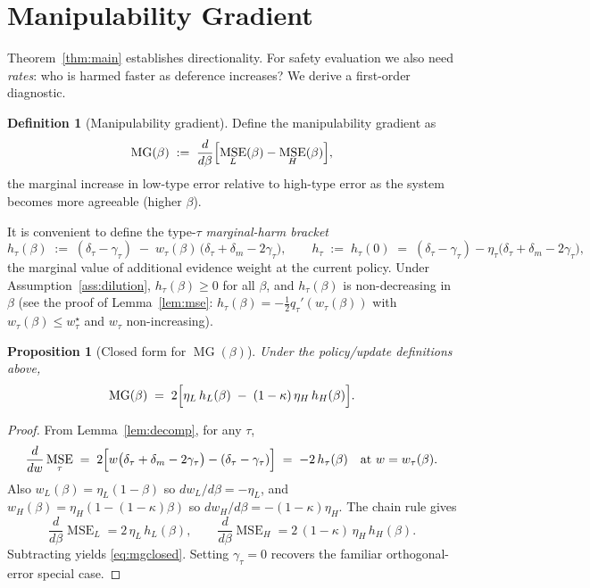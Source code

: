 \documentclass[11pt]{article}
\newtheorem{proposition}[theorem]{Proposition}
\theoremstyle{definition}
\newtheorem{definition}[theorem]{Definition}
\theoremstyle{remark}
\numberwithin{equation}{section}
\DeclareMathOperator{\MSE}{MSE}
\DeclareMathOperator{\MG}{MG}
\begin{document}
\section{Manipulability Gradient}\label{sec:mg}

Theorem~\ref{thm:main} establishes directionality. For safety evaluation we also need \emph{rates}: who is harmed faster as deference increases? We derive a first-order diagnostic.

\begin{definition}[Manipulability gradient]\label{def:mg}
Define the manipulability gradient as
\begin{equation}\label{eq:mg}
\MG(\beta) \;:=\; \frac{d}{d\beta}\Bigl[\MSE_L(\beta) - \MSE_H(\beta)\Bigr],
\end{equation}
the marginal increase in low-type error relative to high-type error as the system becomes more agreeable (higher $\beta$).
\end{definition}

It is convenient to define the type-$\tau$ \emph{marginal-harm bracket}
\begin{equation}\label{eq:bracket}
h_\tau(\beta) \;:=\; (\delta_\tau - \gamma_\tau) \;-\; w_\tau(\beta)\,\bigl(\delta_\tau + \delta_m - 2\gamma_\tau\bigr),
\qquad
h_\tau \;:=\; h_\tau(0) \;=\; (\delta_\tau - \gamma_\tau) - \eta_\tau\bigl(\delta_\tau + \delta_m - 2\gamma_\tau\bigr),
\end{equation}
the marginal value of additional evidence weight at the current policy. Under Assumption~\ref{ass:dilution}, $h_\tau(\beta) \ge 0$ for all $\beta$, and $h_\tau(\beta)$ is non-decreasing in $\beta$ (see the proof of Lemma~\ref{lem:mse}: $h_\tau(\beta) = -\tfrac{1}{2} q_\tau'(w_\tau(\beta))$ with $w_\tau(\beta) \le w_\tau^\star$ and $w_\tau$ non-increasing).

\begin{proposition}[Closed form for $\MG(\beta)$]\label{prop:closed}
Under the policy/update definitions above,
\begin{equation}\label{eq:mgclosed}
\MG(\beta) \;=\; 2\Bigl[\eta_L\, h_L(\beta) \;-\; (1-\kappa)\,\eta_H\, h_H(\beta)\Bigr].
\end{equation}
\end{proposition}

\begin{proof}
From Lemma~\ref{lem:decomp}, for any $\tau$,
\[
\frac{d}{dw}\MSE_\tau \;=\; 2\Bigl[w\bigl(\delta_\tau + \delta_m - 2\gamma_\tau\bigr) - (\delta_\tau - \gamma_\tau)\Bigr] \;=\; -2\,h_\tau(\beta) \quad \text{at } w = w_\tau(\beta).
\]
Also $w_L(\beta) = \eta_L(1-\beta)$ so $dw_L/d\beta = -\eta_L$, and $w_H(\beta) = \eta_H(1-(1-\kappa)\beta)$ so $dw_H/d\beta = -(1-\kappa)\eta_H$. The chain rule gives
\[
\frac{d}{d\beta}\MSE_L = 2\,\eta_L\, h_L(\beta),
\qquad
\frac{d}{d\beta}\MSE_H = 2\,(1-\kappa)\,\eta_H\, h_H(\beta).
\]
Subtracting yields \eqref{eq:mgclosed}. Setting $\gamma_\tau = 0$ recovers the familiar orthogonal-error special case.
\end{proof}
\end{document}
